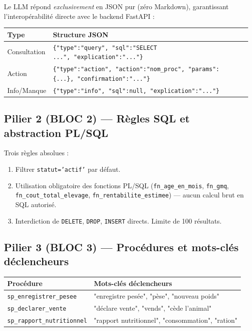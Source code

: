 \documentclass[12pt, a4paper, oneside]{report}
\begin{document}
Le LLM répond \emph{exclusivement} en JSON pur (zéro Markdown), garantissant
l'interopérabilité directe avec le backend FastAPI :

\begin{center}\small
  \begin{tabularx}{\textwidth}{@{}L{2.2cm}X@{}}
    \toprule
    \textbf{Type} & \textbf{Structure JSON} \\
    \midrule
    Consultation & \texttt{\{"type":"query",\ "sql":"SELECT ...",\ "explication":"..."\}} \\
    Action       & \texttt{\{"type":"action",\ "action":"nom\_proc",\ "params":\{...\},\ "confirmation":"..."\}} \\
    Info/Manque  & \texttt{\{"type":"info",\ "sql":null,\ "explication":"..."\}} \\
    \bottomrule
  \end{tabularx}
\end{center}

\subsection{Pilier 2 (BLOC 2) — Règles SQL et abstraction PL/SQL}

Trois règles absolues :
\begin{enumerate}[itemsep=2pt]
  \item Filtrer \texttt{statut='actif'} par défaut.
  \item Utilisation obligatoire des fonctions PL/SQL
    (\texttt{fn\_age\_en\_mois}, \texttt{fn\_gmq}, \texttt{fn\_cout\_total\_elevage},
    \texttt{fn\_rentabilite\_estimee}) — aucun calcul brut en SQL autorisé.
  \item Interdiction de \texttt{DELETE}, \texttt{DROP}, \texttt{INSERT} directs.
    Limite de 100 résultats.
\end{enumerate}

\subsection{Pilier 3 (BLOC 3) — Procédures et mots-clés déclencheurs}

\begin{center}\small
  \begin{tabularx}{\textwidth}{@{}L{5.2cm}X@{}}
    \toprule
    \textbf{Procédure} & \textbf{Mots-clés déclencheurs} \\
    \midrule
    \texttt{sp\_enregistrer\_pesee}    & "enregistre pesée", "pèse", "nouveau poids" \\
    \texttt{sp\_declarer\_vente}       & "déclare vente", "vends", "cède l'animal" \\
    \texttt{sp\_rapport\_nutritionnel} & "rapport nutritionnel", "consommation", "ration" \\
    \bottomrule
  \end{tabularx}
\end{center}
\end{document}
